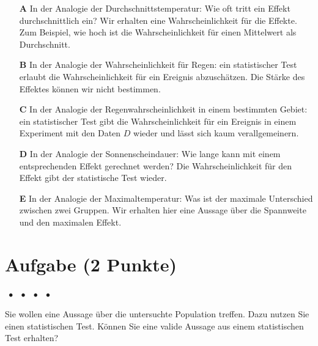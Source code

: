 \documentclass[a4paper, 9pt]{scrartcl}\usepackage[]{graphicx}\usepackage[]{xcolor}
\begin{document}
\begin{enumerate}
\item [\textbf{A} \msquare] In der Analogie der Durchschnittstemperatur: Wie oft tritt ein Effekt durchschnittlich ein? Wir erhalten eine Wahrscheinlichkeit für die Effekte. Zum Beispiel, wie hoch ist die Wahrscheinlichkeit für einen Mittelwert als Durchschnitt.
\item [\textbf{B} \msquare] In der Analogie der Wahrscheinlichkeit für Regen: ein statistischer Test erlaubt die Wahrscheinlichkeit für ein Ereignis abzuschätzen. Die Stärke des Effektes können wir nicht bestimmen.
\item [\textbf{C} \msquare] In der Analogie der Regenwahrscheinlichkeit in einem bestimmten Gebiet: ein statistischer Test gibt die Wahrscheinlichkeit für ein Ereignis in einem Experiment mit den Daten $D$ wieder und lässt sich kaum verallgemeinern.
\item [\textbf{D} \msquare] In der Analogie der Sonnenscheindauer: Wie lange kann mit einem entsprechenden Effekt gerechnet werden? Die Wahrscheinlichkeit für den Effekt gibt der statistische Test wieder.
\item [\textbf{E} \msquare] In der Analogie der Maximaltemperatur: Was ist der maximale Unterschied zwischen zwei Gruppen. Wir erhalten hier eine Aussage über die Spannweite und den maximalen Effekt.
\end{enumerate}

\section{Aufgabe \hfill (2 Punkte)}

\ifcollection
\begin{flushright}
\tiny\vspace{-2Ex}
\textbf{\examinhaltstart}
\exammodulemathstat $\;\bullet$
\exammodulestat $\;\bullet$
\exammodulestatbbv $\;\bullet$
\exammodulestatversuch $\;\bullet$
\exammodulebiostat
\vspace{-1Ex}
\end{flushright}
\fi




Sie wollen eine Aussage über die untersuchte Population treffen. Dazu nutzen Sie einen statistischen Test. Können Sie eine valide Aussage aus einem statistischen Test erhalten?
\end{document}
